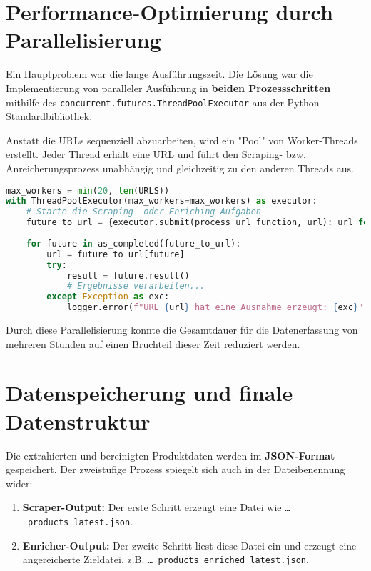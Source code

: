 \documentclass[12pt, a4paper]{report} %
\begin{document}
\section{Performance-Optimierung durch Parallelisierung}
\label{sec:scraping_performance}
Ein Hauptproblem war die lange Ausführungszeit. Die Lösung war die Implementierung von paralleler Ausführung in \textbf{beiden Prozessschritten} mithilfe des \texttt{concurrent.futures.ThreadPoolExecutor} aus der Python-Standardbibliothek.

Anstatt die URLs sequenziell abzuarbeiten, wird ein "Pool" von Worker-Threads erstellt. Jeder Thread erhält eine URL und führt den Scraping- bzw. Anreicherungsprozess unabhängig und gleichzeitig zu den anderen Threads aus.

\begin{lstlisting}[language=Python, caption={Parallele Ausführung mit ThreadPoolExecutor}]
max_workers = min(20, len(URLS))
with ThreadPoolExecutor(max_workers=max_workers) as executor:
    # Starte die Scraping- oder Enriching-Aufgaben
    future_to_url = {executor.submit(process_url_function, url): url for url in URLS}
    
    for future in as_completed(future_to_url):
        url = future_to_url[future]
        try:
            result = future.result()
            # Ergebnisse verarbeiten...
        except Exception as exc:
            logger.error(f"URL {url} hat eine Ausnahme erzeugt: {exc}")
\end{lstlisting}
Durch diese Parallelisierung konnte die Gesamtdauer für die Datenerfassung von mehreren Stunden auf einen Bruchteil dieser Zeit reduziert werden.

\section{Datenspeicherung und finale Datenstruktur}
\label{sec:scraping_datenspeicherung}
Die extrahierten und bereinigten Produktdaten werden im \textbf{JSON-Format} gespeichert. Der zweistufige Prozess spiegelt sich auch in der Dateibenennung wider:
\begin{enumerate}
    \item \textbf{Scraper-Output:} Der erste Schritt erzeugt eine Datei wie \texttt{\ldots\_products\_latest.json}.
    \item \textbf{Enricher-Output:} Der zweite Schritt liest diese Datei ein und erzeugt eine angereicherte Zieldatei, z.B. \texttt{\ldots\_products\_enriched\_latest.json}.
\end{enumerate}
\end{document}
